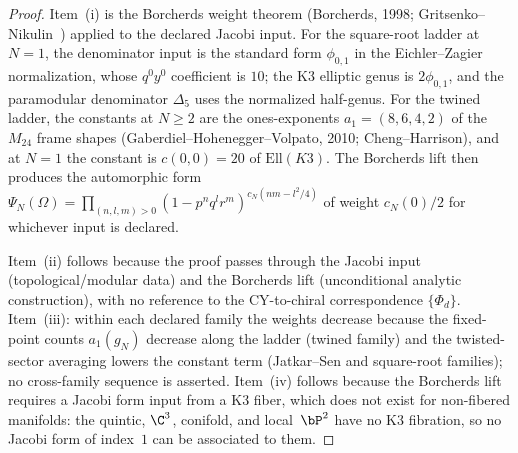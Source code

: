 \begin{proof}
Item~(i) is the Borcherds weight theorem \textup{(}Borcherds, 1998; Gritsenko--Nikulin~\cite{GritsenkoNikulin1995}\textup{)} applied to the declared Jacobi input. For the square-root ladder at $N = 1$, the denominator input is the standard form $\phi_{0,1}$ in the Eichler--Zagier normalization, whose $q^0y^0$ coefficient is \(10\); the K3 elliptic genus is \(2\phi_{0,1}\), and the paramodular denominator \(\Delta_5\) uses the normalized half-genus. For the twined ladder, the constants at $N \geq 2$ are the ones-exponents $a_1 = (8, 6, 4, 2)$ of the $M_{24}$ frame shapes \textup{(}Gaberdiel--Hohenegger--Volpato, 2010; Cheng--Harrison\textup{)}, and at $N = 1$ the constant is $c(0,0) = 20$ of $\mathrm{Ell}(K3)$. The Borcherds lift then produces the automorphic form $\Psi_N(\Omega) = \prod_{(n,l,m) > 0} (1 - p^n q^l r^m)^{c_N(nm - l^2/4)}$ of weight $c_N(0)/2$ for whichever input is declared.

Item~(ii) follows because the proof passes through the Jacobi input \textup{(}topological/modular data\textup{)} and the Borcherds lift \textup{(}unconditional analytic construction\textup{)}, with no reference to the CY-to-chiral correspondence $\{\Phi_d\}$. Item~(iii): within each declared family the weights decrease because the fixed-point counts $a_1(g_N)$ decrease along the ladder (twined family) and the twisted-sector averaging lowers the constant term (Jatkar--Sen and square-root families); no cross-family sequence is asserted. Item~(iv) follows because the Borcherds lift requires a Jacobi form input from a K3 fiber, which does not exist for non-fibered manifolds: the quintic, $\C^3$, conifold, and local~$\bP^2$ have no K3 fibration, so no Jacobi form of index~$1$ can be associated to them.
\end{proof}

